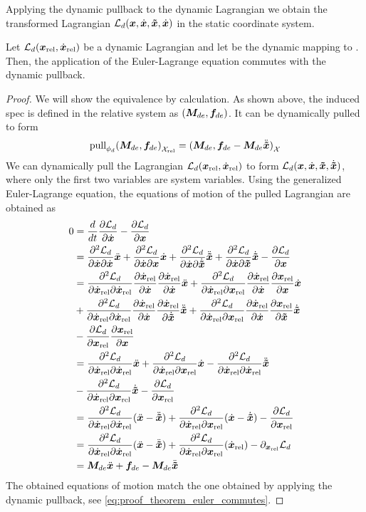 Applying the dynamic pullback to the dynamic Lagrangian we obtain the transformed
Lagrangian $\ld(\x, \xdot, \xt, \xdot)$ in the static coordinate system.

\begin{theorem}
  Let $\ld(\xr,\xrdot)$ be a dynamic Lagrangian and let \mapd{} be
  the dynamic mapping to \xr{}. Then, the application of the Euler-Lagrange equation
  commutes with the dynamic pullback.
  \label{the:dynamic_euler_lagrange}
\end{theorem}

\begin{proof}
  We will show the equivalence by calculation. As shown above, the induced spec is defined
in the relative system as $(\Mde, \fde)$. It can be dynamically pulled to form
\begin{equation}
  \pull{\mapd}{{(\Mde,\fde)}_{\Xr}} = {(\Mde, \fde - \Mde\xtddot)}_{\X}
  \label{eq:proof_theorem_euler_commutes}
\end{equation}
We can dynamically pull the Lagrangian $\ld(\xr,\xrdot)$
to form $\ld(\x,\xdot,\xt,\xtdot)$, where only the first two variables are system
variables. Using the generalized Euler-Lagrange equation, the equations of motion of the
pulled Lagrangian are obtained as
\begin{align*}
  0 &= \dert{\derf{\xdot}{\ld}}
      - \derf{\x}{\ld} \\
    &=  \derftwo{\xdot}{\xdot}{\ld}\xddot
      + \derftwo{\xdot}{\x}{\ld}\xdot
      + \derftwo{\xdot}{\xtdot}{\ld}\xtddot
      + \derftwo{\xdot}{\xt}{\ld}\xtdot
      - \derf{\x}{\ld} \\
    &=  \derftwo{\xrdot}{\xrdot}{\ld}\derf{\xdot}{\xrdot}\derf{\xdot}{\xrdot}\xddot 
      + \derftwo{\xrdot}{\xr}{\ld}\derf{\xdot}{\xrdot}\derf{\x}{\xr}\xdot \\
      &+ \derftwo{\xrdot}{\xrdot}{\ld}\derf{\xdot}{\xrdot}\derf{\xtdot}{\xrdot}\xtddot
      + \derftwo{\xrdot}{\xr}{\ld}\derf{\xdot}{\xrdot}\derf{\xt}{\xr}\xtdot \\
      &- \derf{\xr}{\ld}\derf{\x}{\xr} \\
    &=  \derftwo{\xrdot}{\xrdot}{\ld}\xddot
      + \derftwo{\xrdot}{\xr}{\ld}\xdot
      - \derftwo{\xrdot}{\xrdot}{\ld}\xtddot \\
      &- \derftwo{\xrdot}{\xr}{\ld}\xtdot
      - \derf{\xr}{\ld} \\
    &=  \derftwo{\xrdot}{\xrdot}{\ld}(\xddot - \xtddot)
      + \derftwo{\xrdot}{\xr}{\ld}(\xdot - \xtdot)
      - \derf{\xr}{\ld} \\
    &=  \derftwo{\xrdot}{\xrdot}{\ld}(\xddot - \xtddot)
      + \derftwo{\xrdot}{\xr}{\ld}(\xrdot)
      - \der{\xr}{\ld} \\
    &= \Mde \xddot + \fde - \Mde\xtddot
\end{align*}
The obtained equations of motion match the one obtained by applying the dynamic pullback,
see \cref{eq:proof_theorem_euler_commutes}.
\end{proof}
